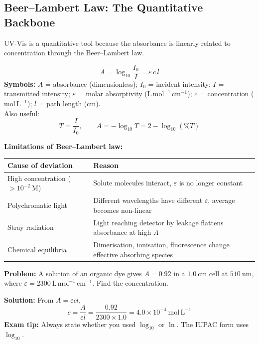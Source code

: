 \documentclass[12pt,a4paper]{article}
\begin{document}
\subsection{Beer--Lambert Law: The Quantitative Backbone}
UV-Vis is a quantitative tool because the absorbance is linearly related to concentration through the Beer--Lambert law.

\begin{tcolorbox}[formulabox, title={Beer--Lambert Law}]
\[
A=\log_{10}\!\frac{I_0}{I}=\varepsilon\,c\,l
\]
\textbf{Symbols:} $A$ = absorbance (dimensionless); $I_0$ = incident intensity; $I$ = transmitted intensity; $\varepsilon$ = molar absorptivity ($\mathrm{L\,mol^{-1}\,cm^{-1}}$); $c$ = concentration ($\mathrm{mol\,L^{-1}}$); $l$ = path length (cm).\\
Also useful:
\[
T=\frac{I}{I_0},\qquad A=-\log_{10}T=2-\log_{10}(\%T)
\]
\end{tcolorbox}

\textbf{Limitations of Beer--Lambert law:}\par\noindent
\begin{tabularx}{\linewidth}{|B{3.4cm}|Y|}
\hline
\textbf{Cause of deviation} & \textbf{Reason} \\
\hline
High concentration ($>10^{-2}\ \mathrm{M}$) & Solute molecules interact, $\varepsilon$ is no longer constant \\
\hline
Polychromatic light & Different wavelengths have different $\varepsilon$, average becomes non-linear \\
\hline
Stray radiation & Light reaching detector by leakage flattens absorbance at high $A$ \\
\hline
Chemical equilibria & Dimerisation, ionisation, fluorescence change effective absorbing species \\
\hline
\end{tabularx}

\begin{tcolorbox}[examplebox, title={Solved Example: Absorbance to Concentration}]
\textbf{Problem:} A solution of an organic dye gives $A=0.92$ in a $1.0\ \mathrm{cm}$ cell at $510\ \mathrm{nm}$, where $\varepsilon=2300\ \mathrm{L\,mol^{-1}\,cm^{-1}}$. Find the concentration.

\textbf{Solution:} From $A=\varepsilon c l$,
\[
c=\frac{A}{\varepsilon l}=\frac{0.92}{2300\times 1.0}=4.0\times 10^{-4}\ \mathrm{mol\,L^{-1}}
\]
\textbf{Exam tip:} Always state whether you used $\log_{10}$ or $\ln$. The IUPAC form uses $\log_{10}$.
\end{tcolorbox}
\end{document}
